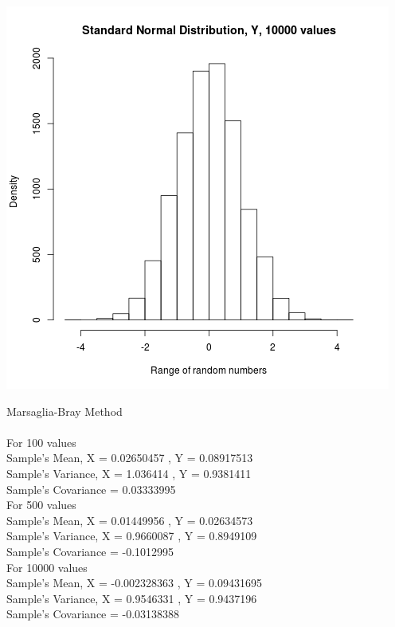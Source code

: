 \documentclass{article}
\begin{document}
\includegraphics{"plot1_3_Y"}

\pagebreak



Marsaglia-Bray Method\\\\

For 100 values\\
Sample's Mean, X =  0.02650457 , Y =  0.08917513 \\
Sample's Variance, X =  1.036414 , Y =  0.9381411 \\
Sample's Covariance =  0.03333995 \\

For 500 values\\
Sample's Mean, X =  0.01449956 , Y =  0.02634573 \\
Sample's Variance, X =  0.9660087 , Y =  0.8949109 \\
Sample's Covariance =  -0.1012995 \\

For 10000 values\\
Sample's Mean, X =  -0.002328363 , Y =  0.09431695 \\
Sample's Variance, X =  0.9546331 , Y =  0.9437196 \\
Sample's Covariance =  -0.03138388 \\
\end{document}
